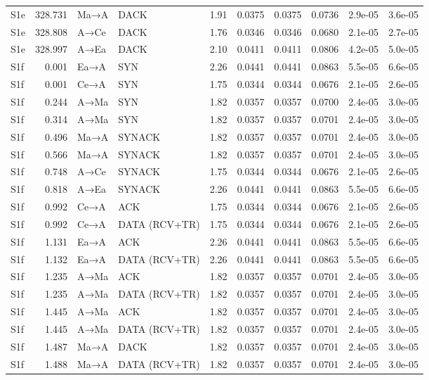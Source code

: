 \documentclass[10pt,letterpaper]{article}
\begin{document}
{\begin{longtable}{@{}lrllrrrrrr@{}}
S1e & 328.731 & Ma→A & DACK & 1.91 & 0.0375 & 0.0375 & 0.0736 & 2.9e-05 & 3.6e-05 \\
S1e & 328.808 & A→Ce & DACK & 1.76 & 0.0346 & 0.0346 & 0.0680 & 2.1e-05 & 2.7e-05 \\
S1e & 328.997 & A→Ea & DACK & 2.10 & 0.0411 & 0.0411 & 0.0806 & 4.2e-05 & 5.0e-05 \\
S1f & 0.001 & Ea→A & SYN & 2.26 & 0.0441 & 0.0441 & 0.0863 & 5.5e-05 & 6.6e-05 \\
S1f & 0.001 & Ce→A & SYN & 1.75 & 0.0344 & 0.0344 & 0.0676 & 2.1e-05 & 2.6e-05 \\
S1f & 0.244 & A→Ma & SYN & 1.82 & 0.0357 & 0.0357 & 0.0700 & 2.4e-05 & 3.0e-05 \\
S1f & 0.314 & A→Ma & SYN & 1.82 & 0.0357 & 0.0357 & 0.0701 & 2.4e-05 & 3.0e-05 \\
S1f & 0.496 & Ma→A & SYNACK & 1.82 & 0.0357 & 0.0357 & 0.0701 & 2.4e-05 & 3.0e-05 \\
S1f & 0.566 & Ma→A & SYNACK & 1.82 & 0.0357 & 0.0357 & 0.0701 & 2.4e-05 & 3.0e-05 \\
S1f & 0.748 & A→Ce & SYNACK & 1.75 & 0.0344 & 0.0344 & 0.0676 & 2.1e-05 & 2.6e-05 \\
S1f & 0.818 & A→Ea & SYNACK & 2.26 & 0.0441 & 0.0441 & 0.0863 & 5.5e-05 & 6.6e-05 \\
S1f & 0.992 & Ce→A & ACK & 1.75 & 0.0344 & 0.0344 & 0.0676 & 2.1e-05 & 2.6e-05 \\
S1f & 0.992 & Ce→A & DATA (RCV+TR) & 1.75 & 0.0344 & 0.0344 & 0.0676 & 2.1e-05 & 2.6e-05 \\
S1f & 1.131 & Ea→A & ACK & 2.26 & 0.0441 & 0.0441 & 0.0863 & 5.5e-05 & 6.6e-05 \\
S1f & 1.132 & Ea→A & DATA (RCV+TR) & 2.26 & 0.0441 & 0.0441 & 0.0863 & 5.5e-05 & 6.6e-05 \\
S1f & 1.235 & A→Ma & ACK & 1.82 & 0.0357 & 0.0357 & 0.0701 & 2.4e-05 & 3.0e-05 \\
S1f & 1.235 & A→Ma & DATA (RCV+TR) & 1.82 & 0.0357 & 0.0357 & 0.0701 & 2.4e-05 & 3.0e-05 \\
S1f & 1.445 & A→Ma & ACK & 1.82 & 0.0357 & 0.0357 & 0.0701 & 2.4e-05 & 3.0e-05 \\
S1f & 1.445 & A→Ma & DATA (RCV+TR) & 1.82 & 0.0357 & 0.0357 & 0.0701 & 2.4e-05 & 3.0e-05 \\
S1f & 1.487 & Ma→A & DACK & 1.82 & 0.0357 & 0.0357 & 0.0701 & 2.4e-05 & 3.0e-05 \\
S1f & 1.488 & Ma→A & DATA (RCV+TR) & 1.82 & 0.0357 & 0.0357 & 0.0701 & 2.4e-05 & 3.0e-05 \\

\end{longtable}}
\end{document}
